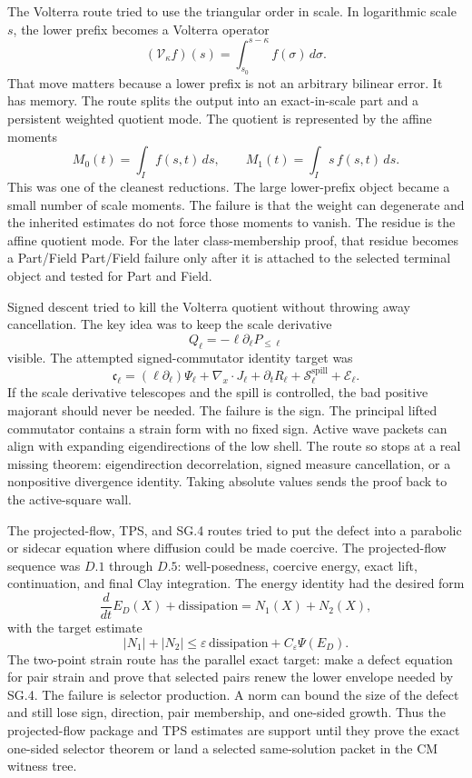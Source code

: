 The Volterra route tried to use the triangular order in scale.
In logarithmic scale \(s\), the lower prefix becomes a Volterra operator
\[
  (\mathcal V_\kappa f)(s)=\int_{s_0}^{s-\kappa}f(\sigma)\,d\sigma .
\]
That move matters because a lower prefix is not an arbitrary bilinear error.
It has memory.
The route splits the output into an exact-in-scale part and a persistent
weighted quotient mode.
The quotient is represented by the affine moments
\[
  M_0(t)=\int_I f(s,t)\,ds,
  \qquad
  M_1(t)=\int_I s\,f(s,t)\,ds .
\]
This was one of the cleanest reductions.
The large lower-prefix object became a small number of scale moments.
The failure is that the weight can degenerate and the inherited estimates do not
force those moments to vanish.
The residue is the affine quotient mode.
For the later class-membership proof, that residue becomes a Part/Field
Part/Field failure only after it is attached to the selected terminal object and tested
for Part and Field.

Signed descent tried to kill the Volterra quotient without throwing away
cancellation.
The key idea was to keep the scale derivative
\[
  Q_\ell=-\ell\partial_\ell P_{\le \ell}
\]
visible.
The attempted signed-commutator identity target was
\[
  \mathfrak c_\ell
  =
  (\ell\partial_\ell)\Psi_\ell
  +\nabla_x\cdot J_\ell
  +\partial_t R_\ell
  +\mathcal S_\ell^{\mathrm{spill}}
  +\mathcal E_\ell .
\]
If the scale derivative telescopes and the spill is controlled, the bad
positive majorant should never be needed.
The failure is the sign.
The principal lifted commutator contains a strain form with no fixed sign.
Active wave packets can align with expanding eigendirections of the low shell.
The route so stops at a real missing theorem: eigendirection
decorrelation, signed measure cancellation, or a nonpositive divergence
identity.
Taking absolute values sends the proof back to the active-square wall.

The projected-flow, TPS, and SG.4 routes tried to put the defect into a
parabolic or sidecar equation where diffusion could be made coercive.
The projected-flow sequence was \(D.1\) through \(D.5\): well-posedness,
coercive energy, exact lift, continuation, and final Clay integration.
The energy identity had the desired form
\[
  \frac{d}{dt}E_D(X)+\mathrm{dissipation}
  =
  N_1(X)+N_2(X),
\]
with the target estimate
\[
  |N_1|+|N_2|
  \le
  \varepsilon\,\mathrm{dissipation}+C_\varepsilon\Psi(E_D).
\]
The two-point strain route has the parallel exact target: make a defect equation
for pair strain and prove that selected pairs renew the lower envelope needed by
SG.4.
The failure is selector production.
A norm can bound the size of the defect and still lose sign, direction, pair
membership, and one-sided growth.
Thus the projected-flow package and TPS estimates are support until they prove
the exact one-sided selector theorem or land a selected same-solution packet in
the CM witness tree.

